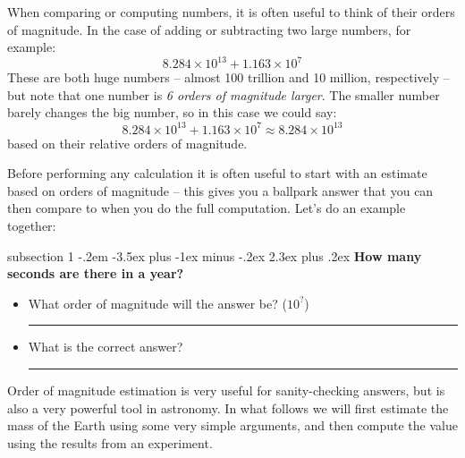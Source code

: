 \documentclass[12pt]{article}
\makeatletter
\newenvironment{problem}{\@startsection
       {subsection}
       {1}
       {-.2em}
       {-3.5ex plus -1ex minus -.2ex}
       {2.3ex plus .2ex}
       {\pagebreak[3]%
       \normalsize\bf\noindent{Problem }
       }
       }
       {%
       }
\makeatother
\begin{document}
 When comparing or computing numbers, it is often useful to think of their orders of magnitude. In the case of adding or subtracting two large numbers, for example:
 \begin{equation*}
	8.284\times10^{13} + 1.163\times10^{7}
 \end{equation*}
These are both huge numbers -- almost 100 trillion and 10 million, respectively -- but note that one number is \emph{6 orders of magnitude larger}. The smaller number barely changes the big number, so in this case we could say:
 \begin{equation*}
	8.284\times10^{13} + 1.163\times10^{7} \approx 8.284\times10^{13}
 \end{equation*}
 based on their relative orders of magnitude.
 
 
Before performing any calculation it is often useful to start with an estimate based on orders of magnitude -- this gives you a ballpark answer that you can then compare to when you do the full computation. Let's do an example together:

\begin{problem}{ }
	\noindent\textbf{How many seconds are there in a year?}
	 \begin{itemize}
	 	\item What order of magnitude will the answer be? ($10^?$) \rule{3cm}{0.75pt}
		\item What is the correct answer? \rule{3cm}{0.75pt}
	\end{itemize}
\end{problem}
\clearpage
Order of magnitude estimation is very useful for sanity-checking answers, but is also a very powerful tool in astronomy. In what follows we will first estimate the mass of the Earth using some very simple arguments, and then compute the value using the results from an experiment.

%
%
\end{document}
